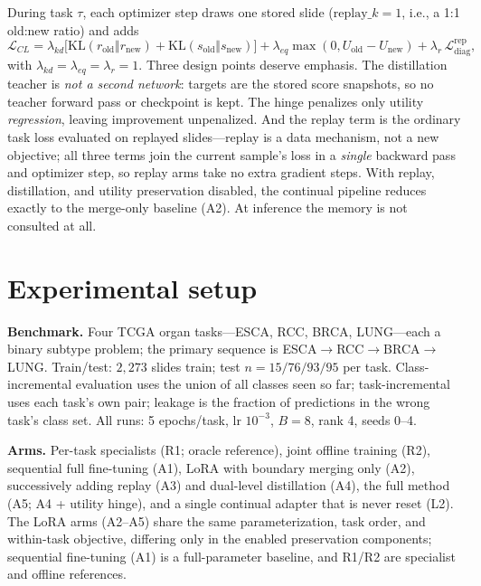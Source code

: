 \documentclass{article}
\begin{document}
During task $\tau$, each optimizer step draws one stored slide ($\mathrm{replay}\_k{=}1$, i.e., a 1:1 old:new ratio) and adds
\begin{equation}
\mathcal{L}_{CL} = \lambda_{kd}\big[\mathrm{KL}(r_{\mathrm{old}}\Vert r_{\mathrm{new}}) + \mathrm{KL}(s_{\mathrm{old}}\Vert s_{\mathrm{new}})\big] + \lambda_{eq}\max(0, U_{\mathrm{old}} - U_{\mathrm{new}}) + \lambda_{r}\,\mathcal{L}_{\mathrm{diag}}^{\mathrm{rep}},
\end{equation}
with $\lambda_{kd}{=}\lambda_{eq}{=}\lambda_{r}{=}1$. Three design points deserve emphasis. The distillation teacher is \emph{not a second network}: targets are the stored score snapshots, so no teacher forward pass or checkpoint is kept. The hinge penalizes only utility \emph{regression}, leaving improvement unpenalized. And the replay term is the ordinary task loss evaluated on replayed slides---replay is a data mechanism, not a new objective; all three terms join the current sample's loss in a \emph{single} backward pass and optimizer step, so replay arms take no extra gradient steps. With replay, distillation, and utility preservation disabled, the continual pipeline reduces exactly to the merge-only baseline (A2). At inference the memory is not consulted at all.

\section{Experimental setup}
\label{sec:setup}
\textbf{Benchmark.} Four TCGA organ tasks---ESCA, RCC, BRCA, LUNG---each a binary subtype problem; the primary sequence is ESCA${\to}$RCC${\to}$BRCA${\to}$LUNG. Train/test: $2{,}273$ slides train; test $n=15/76/93/95$ per task. Class-incremental evaluation uses the union of all classes seen so far; task-incremental uses each task's own pair; leakage is the fraction of predictions in the wrong task's class set. All runs: 5 epochs/task, lr $10^{-3}$, $B{=}8$, rank 4, seeds 0--4.

\textbf{Arms.} Per-task specialists (R1; oracle reference), joint offline training (R2), sequential full fine-tuning (A1), LoRA with boundary merging only (A2), successively adding replay (A3) and dual-level distillation (A4), the full method (A5; A4 + utility hinge), and a single continual adapter that is never reset (L2). The LoRA arms (A2--A5) share the same parameterization, task order, and within-task objective, differing only in the enabled preservation components; sequential fine-tuning (A1) is a full-parameter baseline, and R1/R2 are specialist and offline references.
\end{document}
